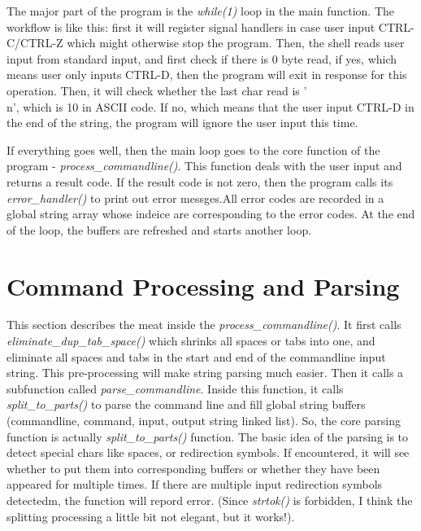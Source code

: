 \documentclass[a4paper,10pt]{article}
\begin{document}
The major part of the program is the \textit{while(1)} loop in the main function. The workflow is like this: first it will register signal handlers
in case user input CTRL-C/CTRL-Z which might otherwise stop the program. Then, the shell reads user input from standard input, and first check if
there is 0 byte read, if yes, which means user only inputs CTRL-D, then the program will exit in response for this operation. Then, it will check 
whether the last char read is '\\n', which is 10 in ASCII code. If no, which means that the user input CTRL-D in the end of the string, the program will
ignore the user input this time.

If everything goes well, then the main loop goes to the core function of the program - \textit{process\_commandline()}. This function deals with
the user input and returns a result code. If the result code is not zero, then the program calls its \textit{error\_handler()} to print out 
error messges.All error codes are recorded in a global string array whose indeice are corresponding to the error codes. At the end of the loop,
the buffers are refreshed and starts another loop.

\section{Command Processing and Parsing}
This section describes the meat inside the \textit{process\_commandline()}. It first calls \textit{eliminate\_dup\_tab\_space()} which shrinks all
spaces or tabs into one, and eliminate all spaces and tabs in the start and end of the commandline input string. This pre-processing will make 
string parsing much easier. Then it calls a subfunction called \textit{parse\_commandline}. Inside this function, it calls \textit{split\_to\_parts()}
to parse the command line and fill global string buffers (commandline, command, input, output string linked list). So, the core parsing function is actually
\textit{split\_to\_parts()} function. The basic idea of the parsing is to detect special chars like spaces, or redirection symbols. If encountered, it will
see whether to put them into corresponding buffers or whether they have been appeared for multiple times. If there are multiple input redirection
symbols detectedm, the function will repord error. (Since \textit{strtok()} is forbidden, I think the splitting processing a little bit not elegant, but
it works!).
\end{document}
